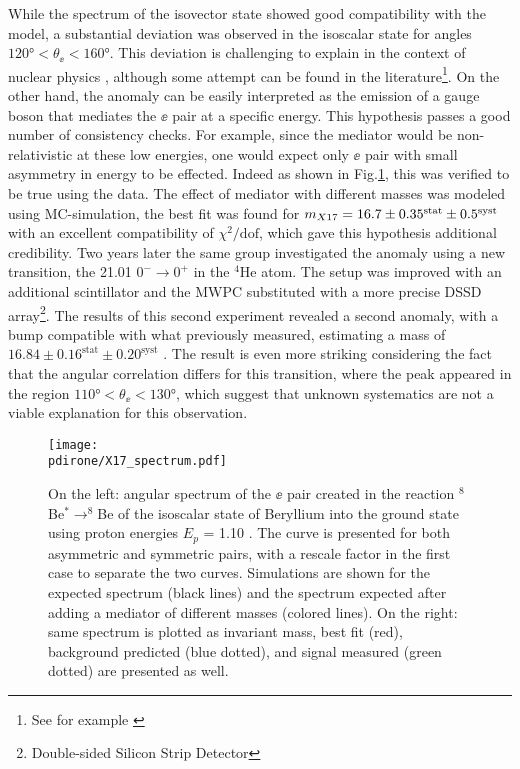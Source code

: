 While the spectrum of the isovector state showed good compatibility with the model, a substantial deviation was observed in the isoscalar state for angles $120 \si{\degree} < \theta_{\ee} < 160 \si{\degree}$. This deviation is challenging to explain in the context of nuclear physics \cite{Krasznahorkay:2015iga}, although some attempt can be found in the literature\footnote{See for example \cite{Zhang:2017zap,Koch:2020ouk}}. On the other hand, the anomaly can be easily interpreted as the emission of a gauge boson that mediates the $\ee$ pair at a specific energy. This hypothesis passes a good number of consistency checks. For example, since the mediator would be non-relativistic at these low energies, one would expect only $\ee$ pair with small asymmetry in energy to be effected. Indeed as shown in Fig.\ref{fig:be-anomaly}, this was verified to be true using the data. The effect of mediator with different masses was modeled using MC-simulation, the best fit was found for $m_{X17} = 16.7 \pm 0.35^{\textrm{stat}} \pm 0.5^{\textrm{syst}}$ with an excellent compatibility of $\chi^2/\textrm{dof}$, which gave this hypothesis additional credibility. Two years later the same group investigated the anomaly using a new transition, the 21.01 \mev $0^- \to 0^+$ in the $^4$He atom. The setup was improved with an additional scintillator and the MWPC substituted with a more precise  DSSD array\footnote{Double-sided Silicon Strip Detector}. The results of this second experiment revealed a second anomaly, with a bump compatible with what previously measured, estimating a mass of $16.84 \pm 0.16^{\textrm{stat}} \pm 0.20^{\textrm{syst}}$ \cite{Krasznahorkay:2019lyl}. The result is even more striking considering the fact that the angular correlation differs for this transition, where the peak appeared in the region $110 \si{\degree} < \theta_{\ee} < 130 \si{\degree}$, which suggest that unknown systematics are not a viable explanation for this observation.

\begin{figure}[htb!]
  \centering
  \texttt{[image: \\pdirone/X17\_spectrum.pdf]}
  \caption[$^8$Be anomaly]{On the left: angular spectrum of the $\ee$ pair created in the reaction $^8$Be$^* \to ^8$Be of the isoscalar state of Beryllium into the ground state using proton energies $E_p$ = 1.10 \mev. The curve is presented for both asymmetric and symmetric pairs, with a rescale factor in the first case to separate the two curves. Simulations are shown for the expected spectrum (black lines) and the spectrum expected after adding a mediator of different masses (colored lines). On the right: same spectrum is plotted as invariant mass, best fit (red), background predicted (blue dotted), and signal measured (green dotted) are presented as well. \cite{Krasznahorkay:2015iga}}
  \label{fig:be-anomaly}
\end{figure}

